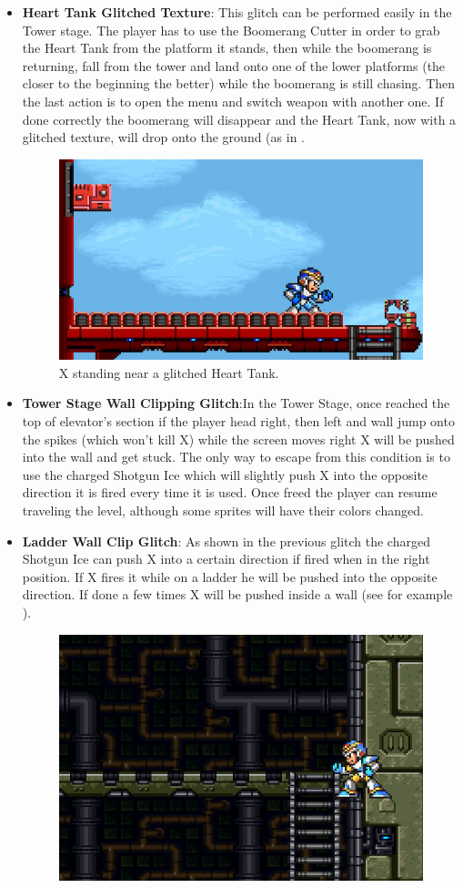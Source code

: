 \begin{itemize}
	\item \textbf{Heart Tank Glitched Texture}: This glitch can be performed easily in the Tower stage. The player has to use the Boomerang Cutter in order to grab the Heart Tank from the platform it stands, then while the boomerang is returning, fall from the tower and land onto one of the lower platforms (the closer to the beginning the better) while the boomerang is still chasing. Then the last action is to open the menu and switch weapon with another one. If done correctly the boomerang will disappear and the Heart Tank, now with a glitched texture, will drop onto the ground (as in .
	\begin{figure}[htp]
		\centering
		\includegraphics[width=0.5\linewidth]{figures/X1/Miscs/Tower_glitched_heart.jpg}
		\caption{X standing near a glitched Heart Tank.}
	\end{figure}
	\item \textbf{Tower Stage Wall Clipping Glitch}:In the Tower Stage, once reached the top of elevator's section if the player head right, then left and wall jump onto the spikes (which won't kill X) while the screen moves right X will be pushed into the wall and get stuck. The only way to escape from this condition is to use the charged Shotgun Ice which will slightly push X into the opposite direction it is fired every time it is used. Once freed the player can resume traveling the level, although some sprites will have their colors changed.
	\item \textbf{Ladder Wall Clip Glitch}: As shown in the previous glitch the charged Shotgun Ice can push X into a certain direction if fired when in the right position. If X fires it while on a ladder he will be pushed into the opposite direction. If done a few times X will be pushed inside a wall (see for example ).
	\begin{figure}[htp]
		\centering
		\includegraphics[width=0.5\linewidth]{figures/X1/Miscs/Wall_clipping.jpg}

\end{figure}
\end{itemize}
